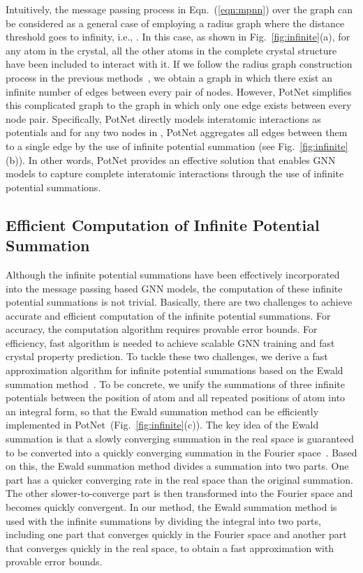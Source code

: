 \documentclass[nohyperref]{article}
\theoremstyle{plain}
\theoremstyle{definition}
\theoremstyle{remark}
\begin{document}
Intuitively, the message passing process in Eqn.~(\ref{eqn:mpnn}) over the graph  can be considered as a general case of employing a radius graph where the distance threshold  goes to infinity, i.e., . In this case, as shown in Fig.~\ref{fig:infinite}(a), for any atom in the crystal, all the other atoms in the complete crystal structure have been included to interact with it. If we follow the radius graph construction process in the previous methods~\citep{xie2018crystal, MegNet, GATGNN, ALIGNN}, we obtain a graph  in which there exist an infinite number of edges between every pair of nodes. However, PotNet simplifies this complicated graph  to the graph  in which only one edge exists between every node pair. Specifically, PotNet directly models interatomic interactions as potentials and for any two nodes in , PotNet aggregates all edges between them to a single edge by the use of infinite potential summation  (see Fig.~\ref{fig:infinite}(b)). In other words, PotNet provides an effective solution that enables GNN models to capture complete interatomic interactions through the use of infinite potential summations.

\subsection{Efficient Computation of Infinite Potential Summation}
\label{algorithm}

Although the infinite potential summations have been effectively incorporated into the message passing based GNN models, the computation of these infinite potential summations is not trivial. Basically, there are two challenges to achieve accurate and efficient computation of the infinite potential summations. For accuracy, the computation algorithm requires provable error bounds. For efficiency, fast algorithm is needed to achieve scalable GNN training and fast crystal property prediction. To tackle these two challenges, we derive a fast approximation algorithm for infinite potential summations based on the Ewald summation method~\citep{ewald, kosmala2023ewald}. To be concrete, we unify the summations of three infinite potentials between the position of atom  and all repeated positions of atom  into an integral form, so that the Ewald summation method can be efficiently implemented in PotNet~(Fig.~\ref{fig:infinite}(c)). The key idea of the Ewald summation is that a slowly converging summation in the real space is guaranteed to be converted into a quickly converging summation in the Fourier space~\citep{woodward2014probability, kosmala2023ewald}. Based on this, the Ewald summation method divides a summation into two parts. One part has a quicker converging rate in the real space than the original summation. The other slower-to-converge part is then transformed into the Fourier space and becomes quickly convergent. In our method, the Ewald summation method is used with the infinite summations by dividing the integral into two parts, including one part that converges quickly in the Fourier space and another part that converges quickly in the real space, to obtain a fast approximation with provable error bounds.
\end{document}
